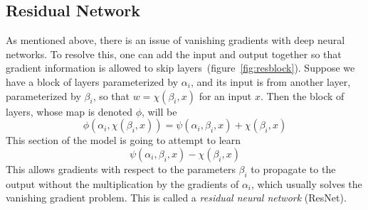 \subsection{Residual Network}
As mentioned above, there is an issue of vanishing gradients with deep neural networks. To resolve this, one can add the input and output together so that gradient information is allowed to skip layers~\cite{he_deep_2015}(figure~\ref{fig:resblock}). Suppose we have a block of layers parameterized by $\alpha_i$, and its input is from another layer, parameterized by $\beta_i$, so that $w=\chi(\beta_i,x)$ for an input $x$. Then the block of layers, whose map is denoted $\phi$, will be
\begin{equation}
	\phi(\alpha_i,\chi(\beta_i,x)) = \psi(\alpha_i,\beta_i,x)+\chi(\beta_i,x)
\end{equation}
This section of the model is going to attempt to learn
\begin{equation}
	\psi(\alpha_i,\beta_i,x)-\chi(\beta_i,x)
\end{equation}
This allows gradients with respect to the parameters $\beta_i$ to propagate to the output without the multiplication by the gradients of $\alpha_i$, which usually solves the vanishing gradient problem. This is called a \textit{residual neural network} (ResNet).
